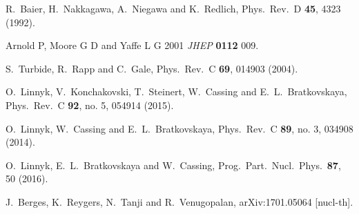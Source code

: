 \documentclass[aps,prc,a4paper,nofootinbib,
preprintnumbers,superscriptaddress,twocolumn,showpacs,showkeys]{revtex4}
\begin{document}
\begin{thebibliography}{99}
  R.~Baier, H.~Nakkagawa, A.~Niegawa and K.~Redlich,
  Phys.\ Rev.\ D {\bf 45}, 4323 (1992).


 Arnold P, Moore G D and Yaffe L G 2001 {\it JHEP} {\bf 0112} 009.

  S.~Turbide, R.~Rapp and C.~Gale,
  Phys.\ Rev.\ C {\bf 69}, 014903 (2004).
  
  O.~Linnyk, V.~Konchakovski, T.~Steinert, W.~Cassing and E.~L.~Bratkovskaya,
  Phys.\ Rev.\ C {\bf 92}, no. 5, 054914 (2015).

  O.~Linnyk, W.~Cassing and E.~L.~Bratkovskaya,
  Phys.\ Rev.\ C {\bf 89}, no. 3, 034908 (2014).
  
  O.~Linnyk, E.~L.~Bratkovskaya and W.~Cassing,
  Prog.\ Part.\ Nucl.\ Phys.\  {\bf 87}, 50 (2016).
  
  J.~Berges, K.~Reygers, N.~Tanji and R.~Venugopalan,
  arXiv:1701.05064 [nucl-th].




\end{thebibliography}
\end{document}
